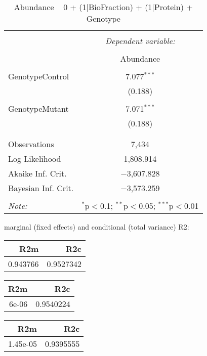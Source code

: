 \documentclass[11pt]{report}
\begin{document}
\begin{table}[!htbp] \centering 
  \caption{Abundance ~ 0 + (1|BioFraction) + (1|Protein) + Genotype} 
  \label{} 
\begin{tabular}{@{\extracolsep{5pt}}lc} 
\\[-1.8ex]\hline 
\hline \\[-1.8ex] 
 & \multicolumn{1}{c}{\textit{Dependent variable:}} \\ 
\cline{2-2} 
\\[-1.8ex] & Abundance \\ 
\hline \\[-1.8ex] 
 GenotypeControl & 7.077$^{***}$ \\ 
  & (0.188) \\ 
  & \\ 
 GenotypeMutant & 7.071$^{***}$ \\ 
  & (0.188) \\ 
  & \\ 
\hline \\[-1.8ex] 
Observations & 7,434 \\ 
Log Likelihood & 1,808.914 \\ 
Akaike Inf. Crit. & $-$3,607.828 \\ 
Bayesian Inf. Crit. & $-$3,573.259 \\ 
\hline 
\hline \\[-1.8ex] 
\textit{Note:}  & \multicolumn{1}{r}{$^{*}$p$<$0.1; $^{**}$p$<$0.05; $^{***}$p$<$0.01} \\ 
\end{tabular} 
\end{table} 
marginal (fixed effects) and conditional (total variance) R2:

\begin{tabular}{r|r}
\hline
R2m & R2c\\
\hline
0.943766 & 0.9527342\\
\hline
\end{tabular}

\begin{tabular}{r|r}
\hline
R2m & R2c\\
\hline
6e-06 & 0.9540224\\
\hline
\end{tabular}

\begin{tabular}{r|r}
\hline
R2m & R2c\\
\hline
1.45e-05 & 0.9395555\\
\hline
\end{tabular}
\end{document}

